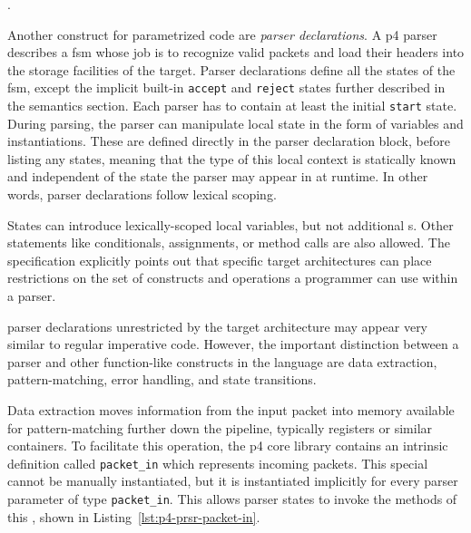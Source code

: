 .

Another construct for parametrized code are \emph{parser declarations}. A
\acrshort{p4} parser describes a \acrlong{fsm} whose job is to recognize valid
packets and load their headers into the storage facilities of the target. Parser
declarations define all the states of the \acrshort{fsm}, except the implicit
built-in \texttt{accept} and \texttt{reject} states further described in the
semantics section. Each parser has to contain at least the
initial \texttt{start} state. During parsing, the parser can manipulate local
state in the form of variables and \extern{} instantiations.
These are defined directly in the parser declaration block, before listing any
states, meaning that the type of this local context is statically known and
independent of the state the parser may appear in at runtime. In other words,
parser declarations follow lexical scoping.

States can introduce lexically-scoped local variables, but not additional
\extern{}s. Other statements like conditionals, assignments, or method calls are
also allowed. The specification explicitly points out that specific target
architectures can place restrictions on the set of constructs and operations a
programmer can use within a parser.

\pfs parser declarations unrestricted by the target architecture may appear very
similar to regular imperative code. However, the important distinction between a
parser and other function-like constructs in the \pfs language are data
extraction, pattern-matching, error handling, and state transitions.

Data extraction moves information from the input packet into memory available
for pattern-matching further down the pipeline, typically registers or similar
containers. To facilitate this operation, the \acrshort{p4} core library
contains an intrinsic \extern{} definition called \texttt{packet\_in}
which represents incoming packets. This special \extern{} cannot be manually
instantiated, but it is
instantiated implicitly for every parser parameter of type
\texttt{packet\_in}. This allows parser states to invoke the methods of this
\extern, shown in Listing~\ref{lst:p4-prsr-packet-in}.

